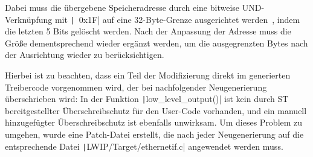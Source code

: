 Dabei muss die übergebene Speicheradresse durch eine bitweise UND-Verknüpfung
mit \texttt|~0x1F| auf eine 32-Byte-Grenze ausgerichtet
werden~\cite{CMSIS_Core_CacheFunctions}, indem die letzten 5 Bits gelöscht
werden. Nach der Anpassung der Adresse muss die Größe dementsprechend wieder
ergänzt werden, um die ausgegrenzten Bytes nach der Ausrichtung wieder zu
berücksichtigen.

Hierbei ist zu beachten, dass ein Teil der Modifizierung direkt im generierten
Treibercode vorgenommen wird, der bei nachfolgender Neugenerierung überschrieben
wird: In der Funktion \texttt|low_level_output()| ist kein durch ST
bereitgestellter Überschreibschutz für den User-Code vorhanden, und ein manuell
hinzugefügter Überschreibschutz ist ebenfalls unwirksam. Um dieses Problem zu
umgehen, wurde eine Patch-Datei erstellt, die nach jeder Neugenerierung auf die
entsprechende Datei \texttt|LWIP/Target/ethernetif.c| angewendet
werden muss.
